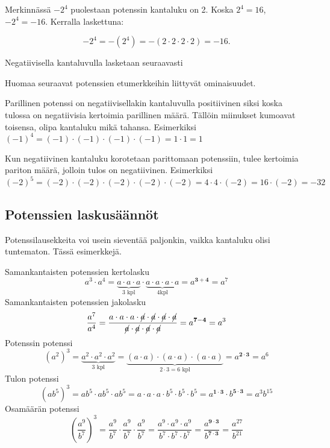 Merkinnässä $-2^4$ puolestaan potenssin kantaluku on 2. Koska $2^4 = 16$,
$-2^4=-16$. Kerralla laskettuna:     

\[ -2^4 =-(2^4)= -(2 \cdot 2\cdot 2 \cdot 2) = -16. \]          
            
    \begin{esimerkki}
        Negatiivisella kantaluvulla lasketaan seuraavasti
    \end{esimerkki}
    
    
Huomaa seuraavat potenssien etumerkkeihin liittyvät ominaisuudet.



Parillinen potenssi on negatiivisellakin kantaluvulla positiivinen siksi koska tulossa on negatiivisia kertoimia parillinen määrä. Tällöin miinukset kumoavat toisensa, olipa kantaluku mikä tahansa. 
Esimerkiksi $(-1)^4=(-1) \cdot (-1) \cdot (-1) \cdot (-1)= 1\cdot 1=1$

Kun negatiivinen kantaluku korotetaan parittomaan potenssiin, tulee kertoimia pariton määrä, jolloin tulos on negatiivinen. 
Esimerkiksi $(-2)^5=(-2) \cdot (-2) \cdot (-2) \cdot (-2) \cdot (-2)=4\cdot4\cdot(-2)=16\cdot(-2)= -32$
    
    
\subsection*{Potenssien laskusäännöt}

Potenssilausekkeita voi usein sieventää paljonkin, vaikka kantaluku
olisi tuntematon. Tässä esimerkkejä.    
    
    Samankantaisten potenssien kertolasku
	\[
a^3\cdot a^4=\underbrace{a\cdot a\cdot a}_{\text{3 kpl}}\cdot \underbrace{a\cdot a\cdot a\cdot a}_{\text{4kpl}}=a^{\mathbf{3+4}}=a^7
    	\]
    Samankantaisten potenssien jakolasku
	\[
\frac{a^7}{a^4}=\frac{a\cdot a\cdot a\cdot \cancel{a}\cdot \cancel{a}\cdot \cancel{a}\cdot \cancel{a}}	{\cancel{a}\cdot \cancel{a}\cdot \cancel{a}\cdot \cancel{a}}=a^{\mathbf{7-4}}=a^3
    	\]
    Potenssin potenssi
	\[
(a^2)^3=\underbrace{a^2\cdot a^2\cdot a^2}_{3\text{ kpl}}=
\underbrace{(a\cdot a)\cdot (a\cdot a)\cdot (a\cdot a)}_{2\cdot 3=6\text{ kpl}}=a^{\boldsymbol{{2\cdot 3}}}=a^6
\]
    Tulon potenssi
	\[
(ab^5)^3=ab^5\cdot ab^5\cdot ab^5=a\cdot a\cdot a\cdot b^5\cdot b^5\cdot b^5=a^{\mathbf{1\cdot 3}}\cdot b^{\mathbf{5\cdot 3}}=a^3b^{15}
	\]
     Osamäärän potenssi
	\[
	\left(\frac{a^9}{b^7}\right)^3=\frac{a^9}{b^7}\cdot \frac{a^9}{b^7}\cdot \frac{a^9}{b^7}=\frac{a^9\cdot a^9\cdot a^9}{b^7\cdot b^7\cdot b^7}=\frac{a^{\mathbf{9\cdot 3}}}{b^{\mathbf{7\cdot 3}}}=\frac{a^{27}}{b^{21}}
	\]

